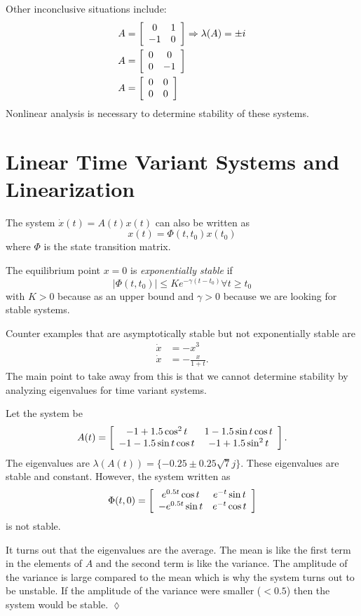 Other inconclusive situations include:
\begin{align*}
A &= \left[\begin{array}{c c} 0 & 1 \\ -1 & 0 \end{array}\right] \Rightarrow\lambda(A)=\pm{}i \\
A &= \left[\begin{array}{c c} 0 & 0 \\ 0 & -1 \end{array}\right] \\
A &= \left[\begin{array}{c c} 0 & 0 \\ 0 & 0 \end{array}\right]
\end{align*}
Nonlinear analysis is necessary to determine stability of these systems.

\section{Linear Time Variant Systems and Linearization}
The system $\dot{x}(t) = A(t)x(t)$ can also be written as
$$x(t) = \Phi(t,t_0)x(t_0)$$
where $\Phi$ is the state transition matrix.

\begin{definition}
The equilibrium point $x=0$ is \textit{exponentially stable} if
$$|\Phi(t,t_0)| \leq Ke^{-\gamma(t-t_0)} \forall t\geq t_0$$
with $K>0$ because as an upper bound and $\gamma>0$ because we are looking for stable systems.
\end{definition}

Counter examples that are asymptotically stable but not exponentially stable are
\begin{align*}
\dot{x} &= -x^3 \\
\dot{x} &= -\frac{x}{1+t}.
\end{align*}
The main point to take away from this is that we cannot determine stability by analyzing eigenvalues for time variant systems.

\begin{example}
Let the system be
$$A(t) = \left[\begin{array}{c c} -1+1.5\cos^2t & 1-1.5\sin t\cos t \\ -1-1.5\sin t\cos t & -1+1.5\sin^2t \end{array}\right].$$
The eigenvalues are $\lambda(A (t)) = \{-0.25\pm{} 0.25\sqrt{7}j\}$. These eigenvalues are stable and constant. However, the system written as
$$\Phi(t,0) = \left[\begin{array}{c c} e^{0.5t}\cos t & e^{-t}\sin t \\ -e^{0.5t}\sin t & e^{-t}\cos t \end{array}\right]$$
is not stable.

It turns out that the eigenvalues are the average. The mean is like the first term in the elements of $A$ and the second term is like the variance. The amplitude of the variance is large compared to the mean which is why the system turns out to be unstable. If the amplitude of the variance were smaller ($<0.5$) then the system would be stable.
$\lozenge$
\end{example}

